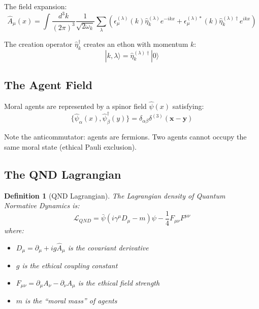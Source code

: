 \documentclass[12pt]{article}
\newtheorem{definition}{Definition}[section]
\begin{document}
The field expansion:
\begin{equation}
    \hat{A}_\mu(x) = \int \frac{d^3k}{(2\pi)^3} \frac{1}{\sqrt{2\omega_k}} \sum_\lambda \left( \epsilon_\mu^{(\lambda)}(k) \hat{\eta}_k^{(\lambda)} e^{-ikx} + \epsilon_\mu^{(\lambda)*}(k) \hat{\eta}_k^{(\lambda)\dagger} e^{ikx} \right)
\end{equation}

The creation operator $\hat{\eta}_k^\dagger$ creates an ethon with momentum $k$:
\begin{equation}
    |k, \lambda\rangle = \hat{\eta}_k^{(\lambda)\dagger} |0\rangle
\end{equation}

\subsection{The Agent Field}

Moral agents are represented by a spinor field $\hat{\psi}(x)$ satisfying:
\begin{equation}
    \{\hat{\psi}_\alpha(x), \hat{\psi}_\beta^\dagger(y)\} = \delta_{\alpha\beta} \delta^{(3)}(\mathbf{x} - \mathbf{y})
\end{equation}

Note the anticommutator: agents are fermions. Two agents cannot occupy the same moral state (ethical Pauli exclusion).

\subsection{The QND Lagrangian}

\begin{definition}[QND Lagrangian]
The Lagrangian density of Quantum Normative Dynamics is:
\begin{equation}
    \mathcal{L}_{QND} = \bar{\psi}(i\gamma^\mu D_\mu - m)\psi - \frac{1}{4} F_{\mu\nu} F^{\mu\nu}
\end{equation}
where:
\begin{itemize}
    \item $D_\mu = \partial_\mu + ig\hat{A}_\mu$ is the covariant derivative
    \item $g$ is the ethical coupling constant
    \item $F_{\mu\nu} = \partial_\mu A_\nu - \partial_\nu A_\mu$ is the ethical field strength
    \item $m$ is the ``moral mass'' of agents
\end{itemize}
\end{definition}
\end{document}

